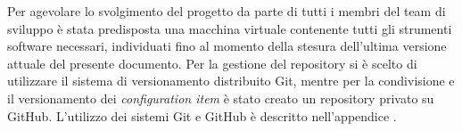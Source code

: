 			Per agevolare lo svolgimento del progetto da parte di tutti i membri del team di sviluppo è stata predisposta una macchina virtuale contenente tutti gli strumenti software necessari, individuati fino al momento della stesura dell'ultima versione attuale del presente documento.
			Per la gestione del repository si è scelto di utilizzare il sistema di versionamento distribuito Git, mentre per la condivisione e il versionamento dei \textit{configuration item} è stato creato un repository privato su GitHub.
			L'utilizzo dei sistemi Git e GitHub è descritto nell'appendice .
